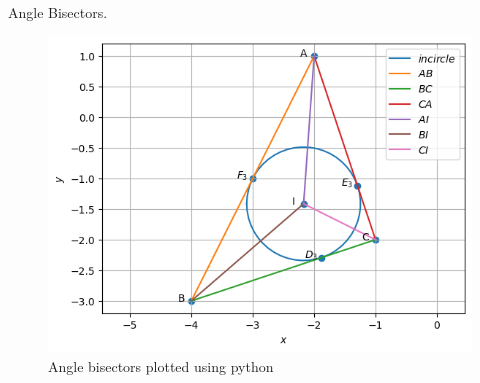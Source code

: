 \begin{table}[H]
        \centering
        
        \caption{Angle Bisectors.}
        \label{tab:Angle_bisector}
    \end{table}
\begin{figure}[H]
\includegraphics[width=\columnwidth]{1-5/figs/Incentre.png}
\caption{Angle bisectors plotted using python}
\label{fig:i_angle_bisector_py}
\end{figure}
